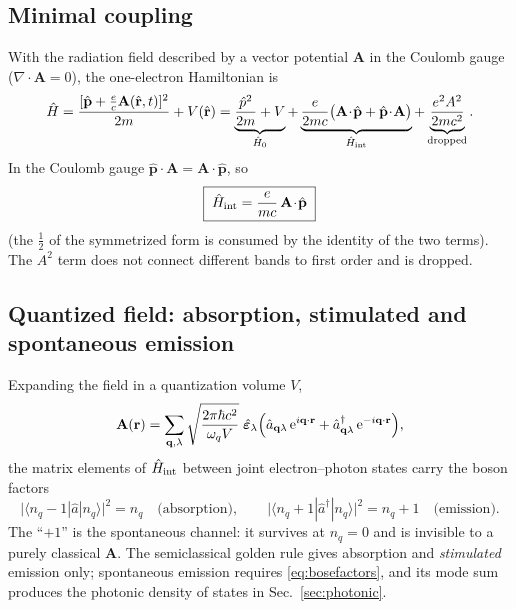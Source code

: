 \documentclass[11pt,a4paper]{article}
\numberwithin{equation}{section}
\newcommand{\eps}{\varepsilon}
\newcommand{\rme}{\mathrm{e}}
\begin{document}
\subsection{Minimal coupling}

With the radiation field described by a vector potential $\mathbf{A}$
in the Coulomb gauge ($\nabla\!\cdot\!\mathbf{A}=0$), the one-electron
Hamiltonian is
\begin{equation}
\hat H=\frac{[\hat{\mathbf p}+\tfrac{e}{c}\mathbf A(\hat{\mathbf r},t)]^2}{2m}
       +V(\hat{\mathbf r})
      =\underbrace{\frac{\hat p^2}{2m}+V}_{\hat H_0}
       +\underbrace{\frac{e}{2mc}\bigl(\mathbf A\!\cdot\!\hat{\mathbf p}
        +\hat{\mathbf p}\!\cdot\!\mathbf A\bigr)}_{\hat H_{\rm int}}
       +\underbrace{\frac{e^2A^2}{2mc^2}}_{\text{dropped}} .
\end{equation}
In the Coulomb gauge $\hat{\mathbf p}\!\cdot\!\mathbf A
=\mathbf A\!\cdot\!\hat{\mathbf p}$, so
\begin{equation}
\boxed{\;\hat H_{\rm int}=\frac{e}{mc}\,\mathbf A\!\cdot\!\hat{\mathbf p}\;}
\label{eq:Hint}
\end{equation}
(the $\tfrac12$ of the symmetrized form is consumed by the identity of
the two terms).  The $A^2$ term does not connect different bands to
first order and is dropped.

\subsection{Quantized field: absorption, stimulated and spontaneous emission}
\label{sec:quantized}

Expanding the field in a quantization volume $V$,
\begin{equation}
\mathbf A(\mathbf r)=\sum_{\mathbf q,\lambda}
\sqrt{\frac{2\pi\hbar c^2}{\omega_q V}}\;\hat{\bm\eps}_\lambda
\Bigl(\hat a_{\mathbf q\lambda}\,\rme^{i\mathbf q\cdot\mathbf r}
     +\hat a^\dagger_{\mathbf q\lambda}\,\rme^{-i\mathbf q\cdot\mathbf r}\Bigr),
\label{eq:Aquant}
\end{equation}
the matrix elements of $\hat H_{\rm int}$ between joint
electron--photon states carry the boson factors
\begin{equation}
\bigl|\langle n_q-1|\hat a|n_q\rangle\bigr|^2=n_q
\quad\text{(absorption)},\qquad
\bigl|\langle n_q+1|\hat a^\dagger|n_q\rangle\bigr|^2=n_q+1
\quad\text{(emission)} .
\label{eq:bosefactors}
\end{equation}
The ``$+1$'' is the spontaneous channel: it survives at $n_q=0$ and is
invisible to a purely classical $\mathbf A$.  The semiclassical golden
rule gives absorption and \emph{stimulated} emission only; spontaneous
emission requires \eqref{eq:bosefactors}, and its mode sum produces the
photonic density of states in Sec.~\ref{sec:photonic}.
\end{document}
